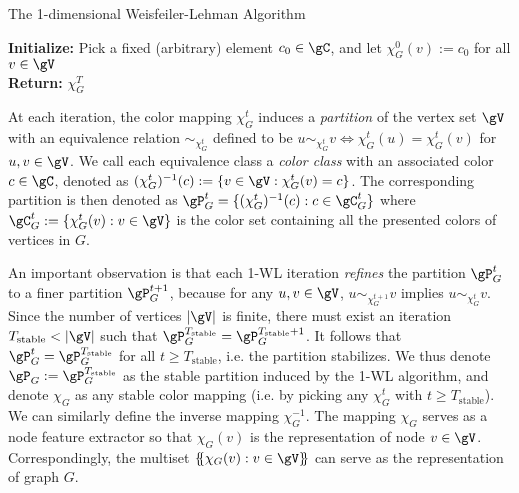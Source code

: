 \documentclass{article} %
\newcommand*{\ldblbrace}{\{\mskip-5mu\{}
\newcommand*{\rdblbrace}{\}\mskip-5mu\}}
\begin{document}
\vspace{-5pt}
\begin{algorithm}[h]
\caption{The 1-dimensional Weisfeiler-Lehman Algorithm}
\label{alg:1wl}
\textbf{Initialize:} Pick a fixed (arbitrary) element $c_0\in \gC$, and let $\chi_G^0(v):=c_0$ for all $v\in\gV$\\
\For{$t \gets 1$ {\normalfont\textbf{to}} $T$}{
    \For{{\normalfont\textbf{each}} $v\in \gV$}{
        $\chi_G^t(v):= \operatorname{hash}\left(\chi_G^{t-1}(v),\ldblbrace \chi_G^{t-1}(u):u\in \mathcal N_G(v) \rdblbrace\right)$\label{alg:1wl_update}
    }
}
\textbf{Return:} $\chi_G^T$
\end{algorithm}
\vspace{-5pt}

At each iteration, the color mapping $\chi_G^t$ induces a \emph{partition} of the vertex set $\gV$ with an equivalence relation $\sim_{\chi_G^t}$ defined to be $u \sim_{\chi_G^t} v \iff \chi_G^t(u)=\chi_G^t(v)$ for $u,v\in\gV$. We call each equivalence class a \emph{color class} with an associated color $c\in \gC$, denoted as $(\chi_G^t)^{-1}(c):=\{v\in\gV:\chi_G^t(v)=c\}$. The corresponding partition is then denoted as $\gP_G^t=\{(\chi_G^t)^{-1}(c):c\in\gC_G^t\}$ where $\gC_G^t:=\{\chi_G^t(v):v\in\gV\}$ is the color set containing all the presented colors of vertices in $G$.

An important observation is that each 1-WL iteration \emph{refines} the partition $\gP_G^t$ to a finer partition $\gP_G^{t+1}$, because for any $u,v\in \gV$, $u \sim_{\chi_G^{t+1}} v$ implies $u \sim_{\chi_G^{t}} v$. Since the number of vertices $|\gV|$ is finite, there must exist an iteration $T_{\text{stable}}<|\gV|$ such that $\gP_G^{T_{\text{stable}}}=\gP_G^{T_{\text{stable}}+1}$. It follows that $\gP_G^{t}=\gP_G^{T_{\text{stable}}}$ for all $t\ge T_{\text{stable}}$, i.e. the partition stabilizes. We thus denote $\gP_G:=\gP_G^{T_{\text{stable}}}$ as the stable partition induced by the 1-WL algorithm, and denote $\chi_G$ as any stable color mapping (i.e. by picking any $\chi_G^t$ with $t\ge T_{\text{stable}}$). We can similarly define the inverse mapping $\chi_G^{-1}$. The mapping $\chi_G$ serves as a node feature extractor so that $\chi_G(v)$ is the representation of node $v\in \gV$. Correspondingly, the multiset $\ldblbrace \chi_G(v):v\in\gV\rdblbrace$ can serve as the representation of graph $G$.
\end{document}
